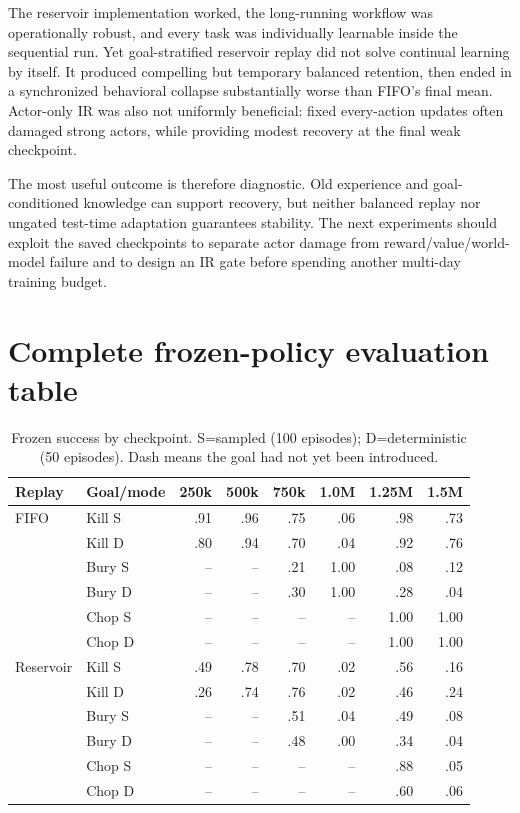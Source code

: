 \documentclass[10pt]{article}
\begin{document}
The reservoir implementation worked, the long-running workflow was operationally robust, and every task was individually learnable inside the sequential run. Yet goal-stratified reservoir replay did not solve continual learning by itself. It produced compelling but temporary balanced retention, then ended in a synchronized behavioral collapse substantially worse than FIFO's final mean. Actor-only IR was also not uniformly beneficial: fixed every-action updates often damaged strong actors, while providing modest recovery at the final weak checkpoint.

The most useful outcome is therefore diagnostic. Old experience and goal-conditioned knowledge can support recovery, but neither balanced replay nor ungated test-time adaptation guarantees stability. The next experiments should exploit the saved checkpoints to separate actor damage from reward/value/world-model failure and to design an IR gate before spending another multi-day training budget.

\clearpage
\appendix

\section{Complete frozen-policy evaluation table}

\begin{table}[H]
\centering
\small
\caption{Frozen success by checkpoint. S=sampled (100 episodes); D=deterministic (50 episodes). Dash means the goal had not yet been introduced.}
\begin{tabular}{llrrrrrr}
\toprule
Replay & Goal/mode & 250k & 500k & 750k & 1.0M & 1.25M & 1.5M \\
\midrule
FIFO & Kill S & .91 & .96 & .75 & .06 & .98 & .73 \\
     & Kill D & .80 & .94 & .70 & .04 & .92 & .76 \\
     & Bury S & -- & -- & .21 & 1.00 & .08 & .12 \\
     & Bury D & -- & -- & .30 & 1.00 & .28 & .04 \\
     & Chop S & -- & -- & -- & -- & 1.00 & 1.00 \\
     & Chop D & -- & -- & -- & -- & 1.00 & 1.00 \\
\midrule
Reservoir & Kill S & .49 & .78 & .70 & .02 & .56 & .16 \\
          & Kill D & .26 & .74 & .76 & .02 & .46 & .24 \\
          & Bury S & -- & -- & .51 & .04 & .49 & .08 \\
          & Bury D & -- & -- & .48 & .00 & .34 & .04 \\
          & Chop S & -- & -- & -- & -- & .88 & .05 \\
          & Chop D & -- & -- & -- & -- & .60 & .06 \\
\bottomrule
\end{tabular}
\end{table}
\end{document}
